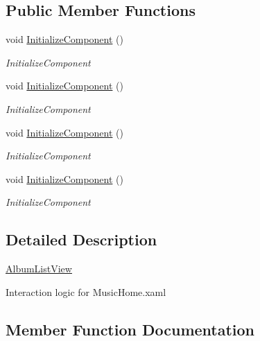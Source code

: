 \subsection*{Public Member Functions}
\begin{DoxyCompactItemize}
\item 
void \hyperlink{class_presentation_1_1_view_1_1_list_1_1_album_list_view_a82f7cb6e5ba3705196d1dcf9d1067b34}{Initialize\+Component} ()
\begin{DoxyCompactList}\small\item\em Initialize\+Component \end{DoxyCompactList}\item 
void \hyperlink{class_presentation_1_1_view_1_1_list_1_1_album_list_view_a82f7cb6e5ba3705196d1dcf9d1067b34}{Initialize\+Component} ()
\begin{DoxyCompactList}\small\item\em Initialize\+Component \end{DoxyCompactList}\item 
void \hyperlink{class_presentation_1_1_view_1_1_list_1_1_album_list_view_a82f7cb6e5ba3705196d1dcf9d1067b34}{Initialize\+Component} ()
\begin{DoxyCompactList}\small\item\em Initialize\+Component \end{DoxyCompactList}\item 
void \hyperlink{class_presentation_1_1_view_1_1_list_1_1_album_list_view_a82f7cb6e5ba3705196d1dcf9d1067b34}{Initialize\+Component} ()
\begin{DoxyCompactList}\small\item\em Initialize\+Component \end{DoxyCompactList}\end{DoxyCompactItemize}


\subsection{Detailed Description}
\hyperlink{class_presentation_1_1_view_1_1_list_1_1_album_list_view}{Album\+List\+View} 

Interaction logic for Music\+Home.\+xaml 

\subsection{Member Function Documentation}
\mbox{\label{class_presentation_1_1_view_1_1_list_1_1_album_list_view_a82f7cb6e5ba3705196d1dcf9d1067b34}} 
